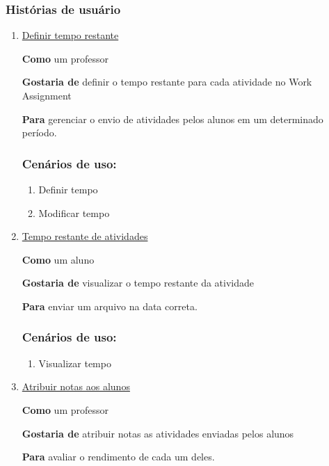\subsubsection*{Histórias de usuário}

\begin{enumerate}
\item \underline{Definir tempo restante}

\textbf{Como} um professor

\textbf{Gostaria de} definir o tempo restante para cada atividade no Work Assignment

\textbf{Para} gerenciar o envio de atividades pelos alunos em um determinado período.

\subsubsection*{Cenários de uso:}
\begin{enumerate}
\item Definir tempo
\item Modificar tempo
\end{enumerate}

\item \underline{Tempo restante de atividades}

\textbf{Como} um aluno

\textbf{Gostaria de} visualizar o tempo restante da atividade

\textbf{Para} enviar um arquivo na data correta.

\subsubsection*{Cenários de uso:}
\begin{enumerate}
\item Visualizar tempo
\end{enumerate}


\item \underline{Atribuir notas aos alunos}

\textbf{Como} um professor

\textbf{Gostaria de} atribuir notas as atividades enviadas pelos alunos

\textbf{Para} avaliar o rendimento de cada um deles.


\end{enumerate}
